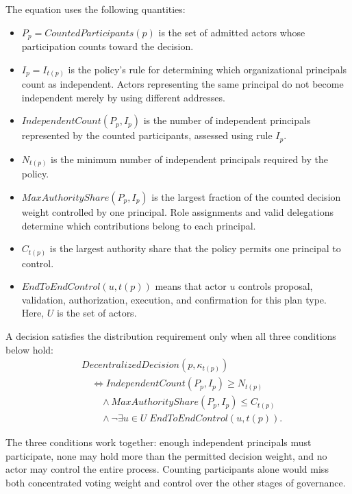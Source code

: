 \documentclass[journal]{IEEEtran}
\begin{document}
The equation uses the following quantities:
\begin{itemize}
    \item $P_p=CountedParticipants(p)$ is the set of admitted
    actors whose participation counts toward the decision.

    \item $I_p=I_{t(p)}$ is the policy's rule for determining
    which organizational principals count as independent.
    Actors representing the same principal do not become
    independent merely by using different addresses.

    \item $IndependentCount(P_p,I_p)$ is the number of
    independent principals represented by the counted
    participants, assessed using rule $I_p$.

    \item $N_{t(p)}$ is the minimum number of independent
    principals required by the policy.

    \item $MaxAuthorityShare(P_p,I_p)$ is the largest fraction
    of the counted decision weight controlled by one principal.
    Role assignments and valid delegations determine which
    contributions belong to each principal.

    \item $C_{t(p)}$ is the largest authority share that the
    policy permits one principal to control.

    \item $EndToEndControl(u,t(p))$ means that actor $u$
    controls proposal, validation, authorization, execution,
    and confirmation for this plan type. Here, $U$ is the
    set of actors.
\end{itemize}

A decision satisfies the distribution requirement only
when all three conditions below hold:
\begin{equation}
\label{eq:decentralized_decision}
\begin{aligned}
&DecentralizedDecision(p,\kappa_{t(p)})\\
&\quad\iff IndependentCount(P_p,I_p)\geq N_{t(p)}\\
&\qquad\land MaxAuthorityShare(P_p,I_p)\leq C_{t(p)}\\
&\qquad\land\neg\exists u\in U\;
EndToEndControl(u,t(p)).
\end{aligned}
\end{equation}

The three conditions work together: enough independent principals
must participate, none may hold more than the permitted decision weight,
and no actor may control the entire process. Counting participants alone
would miss both concentrated voting weight and control over the other
stages of governance.
\end{document}
